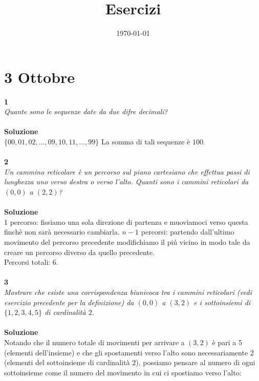 \documentclass[12pt]{article}
\begin{document}
	
	\title{\Huge \textbf{Esercizi}}
	\date{\today}
	\maketitle	
		
	\section*{3 Ottobre}
			\textbf{\large 1} \\
			\textit{Quante sono le sequenze date da due difre decimali?} \\\\
			\textbf{Soluzione} \\
			$\{00,01,02,...,09,10,11,...,99\}$ La somma di tali sequenze \`e $100$. \\\\
			\textbf{\large 2} \\
			\textit{Un cammino reticolare è un percorso sul piano cartesiano che 			effettua passi di lunghezza uno verso destra o verso l’alto. Quanti 				sono i cammini reticolari da $(0,0)$ a $(2,2)$?} \\\\
			\textbf{Soluzione} \\
			1 percorso: fissiamo una sola direzione di partenza e muoviamoci verso questa finch\`e non sar\`a necessario cambiarla.
			$n-1$ percorsi: partendo dall'ultimo movimento del percorso precedente modifichiamo il pi\'u vicino in modo tale da creare un percorso diverso da quello precedente. \\ 
			Percorsi totali: $6$. \\\\			
			\textbf{\large 3} \\
			\textit{Mostrare che esiste una corrispondenza biunivoca tra i cammini reticolari (vedi esercizio precedente per la definizione) da $(0,0)$ a $(3,2)$ e i sottoinsiemi di $\{1,2,3,4,5\}$ di cardinalit\`a $2$.}	\\\\
			\textbf{Soluzione} \\
			Notando che il numero totale di movimenti per arrivare a $(3,2)$ è pari a 5 (elementi dell'insieme) e che gli spostamenti verso l'alto sono necessariamente 2 (elementi del sottoinsieme di cardinalit\`a 2), possiamo pensare al numero di ogni sottoinsieme come il numero del movimento in cui ci spostiamo verso l'alto:\\
			
\end{document}
